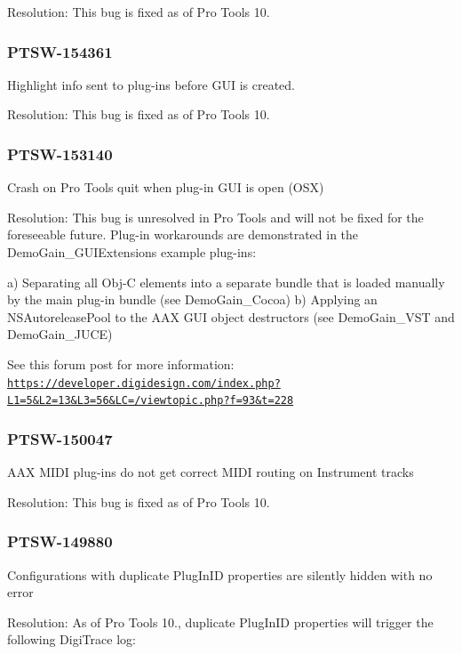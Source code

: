 Resolution\+: This bug is fixed as of Pro Tools 10.\hypertarget{a00374_PTSW-154361}{}\subsubsection{P\+T\+S\+W-\/154361}\label{a00374_PTSW-154361}
Highlight info sent to plug-\/ins before G\+U\+I is created.

Resolution\+: This bug is fixed as of Pro Tools 10.\hypertarget{a00374_PTSW-153140}{}\subsubsection{P\+T\+S\+W-\/153140}\label{a00374_PTSW-153140}
Crash on Pro Tools quit when plug-\/in G\+U\+I is open (O\+S\+X)

Resolution\+: This bug is unresolved in Pro Tools and will not be fixed for the foreseeable future. Plug-\/in workarounds are demonstrated in the Demo\+Gain\+\_\+\+G\+U\+I\+Extensions example plug-\/ins\+:

a) Separating all Obj-\/\+C elements into a separate bundle that is loaded manually by the main plug-\/in bundle (see Demo\+Gain\+\_\+\+Cocoa) b) Applying an N\+S\+Autorelease\+Pool to the A\+A\+X G\+U\+I object destructors (see Demo\+Gain\+\_\+\+V\+S\+T and Demo\+Gain\+\_\+\+J\+U\+C\+E)

See this forum post for more information\+: \href{https://developer.digidesign.com/index.php?L1=5&L2=13&L3=56&LC=/viewtopic.php?f=93&t=228}{\tt https\+://developer.\+digidesign.\+com/index.\+php?\+L1=5\&\+L2=13\&\+L3=56\&\+L\+C=/viewtopic.\+php?f=93\&t=228}\hypertarget{a00374_PTSW-150047}{}\subsubsection{P\+T\+S\+W-\/150047}\label{a00374_PTSW-150047}
A\+A\+X M\+I\+D\+I plug-\/ins do not get correct M\+I\+D\+I routing on Instrument tracks

Resolution\+: This bug is fixed as of Pro Tools 10.\hypertarget{a00374_PTSW-149880}{}\subsubsection{P\+T\+S\+W-\/149880}\label{a00374_PTSW-149880}
Configurations with duplicate Plug\+In\+I\+D properties are silently hidden with no error

Resolution\+: As of Pro Tools 10., duplicate Plug\+In\+I\+D properties will trigger the following Digi\+Trace log\+:

